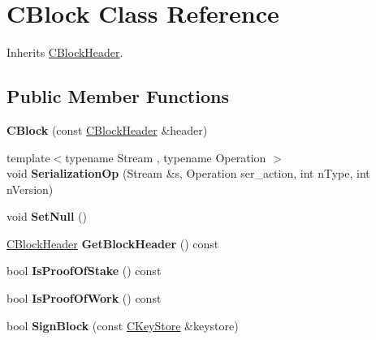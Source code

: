 \hypertarget{class_c_block}{}\section{C\+Block Class Reference}
\label{class_c_block}


Inherits \mbox{\hyperlink{class_c_block_header}{C\+Block\+Header}}.

\subsection*{Public Member Functions}
\begin{DoxyCompactItemize}
\item 
\mbox{\label{class_c_block_aaeb7e05f86d36f481bbc2802768256bc}} 
{\bfseries C\+Block} (const \mbox{\hyperlink{class_c_block_header}{C\+Block\+Header}} \&header)
\item 
\mbox{\label{class_c_block_aa83bbf64300154e8919249f7778f4c17}} 
{\footnotesize template$<$typename Stream , typename Operation $>$ }\\void {\bfseries Serialization\+Op} (Stream \&s, Operation ser\+\_\+action, int n\+Type, int n\+Version)
\item 
\mbox{\label{class_c_block_a0410d7ba8d60679c4cf364b82ffffea5}} 
void {\bfseries Set\+Null} ()
\item 
\mbox{\label{class_c_block_a7c8d280db581c02f49a66a5cdef2eded}} 
\mbox{\hyperlink{class_c_block_header}{C\+Block\+Header}} {\bfseries Get\+Block\+Header} () const
\item 
\mbox{\label{class_c_block_ab70bdac61ff8eca54fd29c835cb4f025}} 
bool {\bfseries Is\+Proof\+Of\+Stake} () const
\item 
\mbox{\label{class_c_block_ad3936367b1b6d5289bb60b42967156ea}} 
bool {\bfseries Is\+Proof\+Of\+Work} () const
\item 
\mbox{\label{class_c_block_a9bb6e84becb89ae53a2251d28732420c}} 
bool {\bfseries Sign\+Block} (const \mbox{\hyperlink{class_c_key_store}{C\+Key\+Store}} \&keystore)
\item 
\mbox{\label{class_c_block_a2ff0deeda85c23cde1a78365d6fc6c2c}} 

\end{DoxyCompactItemize}
